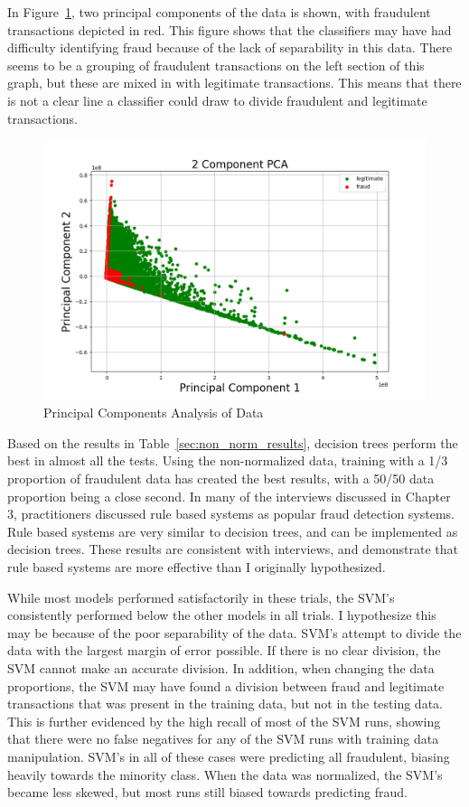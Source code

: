 \documentclass[midd]{thesis}
\begin{document}
In Figure~\ref{fig:data1}, two principal components of the data is shown, with fraudulent transactions depicted in red. This figure shows that the classifiers may have had difficulty identifying fraud because of the lack of separability in this data. There seems to be a grouping of fraudulent transactions on the left section of this graph, but these are mixed in with legitimate transactions. This means that there is not a clear line a classifier could draw to divide fraudulent and legitimate transactions.

\begin{figure} \centering
  \includegraphics[scale=.6]{pca2.png}
  \caption{Principal Components Analysis of Data}
  \label{fig:data1}
\end{figure}

Based on the results in Table~\ref{sec:non_norm_results}, decision trees perform the best in almost all the tests. Using the non-normalized data, training with a 1/3 proportion of fraudulent data has created the best results, with a 50/50 data proportion being a close second. In many of the interviews discussed in Chapter 3, practitioners discussed rule based systems as popular fraud detection systems. Rule based systems are very similar to decision trees, and can be implemented as decision trees. These results are consistent with interviews, and demonstrate that rule based systems are more effective than I originally hypothesized. 

While most models performed satisfactorily in these trials, the SVM's consistently performed below the other models in all trials. I hypothesize this may be because of the poor separability of the data. SVM's attempt to divide the data with the largest margin of error possible. If there is no clear division, the SVM cannot make an accurate division. In addition, when changing the data proportions, the SVM may have found a division between fraud and legitimate transactions that was present in the training data, but not in the testing data. This is further evidenced by the high recall of most of the SVM runs, showing that there were no false negatives for any of the SVM runs with training data manipulation. SVM's in all of these cases were predicting all fraudulent, biasing heavily towards the minority class. When the data was normalized, the SVM's became less skewed, but most runs still biased towards predicting fraud.
\end{document}
